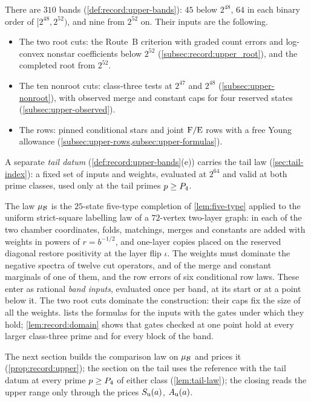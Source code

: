 There are $310$ bands (\cref{def:record:upper-bands}): $45$ below $2^{48}$, $64$
in each binary order of $[2^{48},2^{52})$, and nine from $2^{52}$ on. Their inputs
are the following.
\begin{itemize}
\item The two root cuts: the Route~B criterion with graded count
 errors and log-convex nonstar coefficients below $2^{52}$
 (\cref{subsec:record:upper_root}), and the completed root from $2^{52}$.
\item The ten nonroot cuts: class-three tests at $2^{47}$ and $2^{48}$
 (\cref{subsec:upper-nonroot}), with observed merge and constant caps for four
 reserved states (\cref{subsec:upper-observed}).
\item The rows: pinned conditional stars and joint $\rm F/\rm E$ rows with a free
 Young allowance (\cref{subsec:upper-rows,subsec:upper-formulas}).
\end{itemize}
A separate \emph{tail datum} (\cref{def:record:upper-bands}(e)) carries the tail
law (\cref{sec:tail-index}): a fixed set of inputs and weights, evaluated at
$2^{64}$ and valid at both prime classes, used only at the tail primes
$p\ge P_4$.

The law $\mu_\mathcal B$ is the $25$-state five-type completion of \cref{lem:five-type}
applied to the uniform strict-square labelling law of a $72$-vertex two-layer
graph: in each of the two chamber coordinates, folds, matchings, merges and
constants are added with weights in powers of $r=b^{-1/2}$, and one-layer copies
placed on the reserved diagonal restore positivity at the layer flip $\iota$. The
weights must dominate the negative spectra of twelve cut operators, and of the
merge and constant marginals of one of them, and the row errors of six conditional
row laws. These enter as rational \emph{band inputs}, evaluated once per band, at
its start or at a point below it. The two root cuts dominate the construction:
their caps fix the size of all the weights.  lists
the formulas for the inputs with the gates under which they hold;
\cref{lem:record:domain} shows that gates checked at one point hold at every
larger class-three prime and for every block of the band.

The next section builds the comparison law on $\mu_\mathcal B$ and prices it
(\cref{prop:record:upper}); the section on the tail uses the reference with the
tail datum at every prime $p\ge P_4$ of either class (\cref{lem:tail-law}); the
closing reads the upper range only through the prices $S_{\rm u}(a)$,
$A_{\rm u}(a)$.

